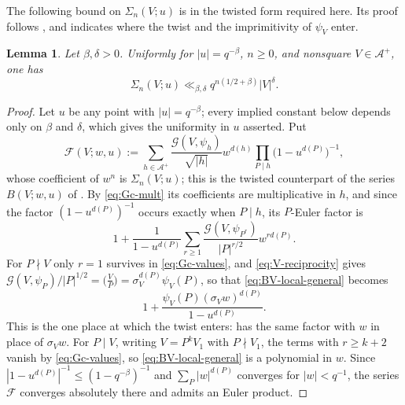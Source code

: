 \documentclass[a4paper,reqno]{amsart}
\numberwithin{equation}{section}
\newtheorem{lemma}[theorem]{Lemma}
\theoremstyle{remark}
\theoremstyle{definition}
\newcommand{\A}{\mathcal{A}}
\newcommand{\Gc}{\mathcal{G}}
\begin{document}
The following bound on $\Sigma_n(V;u)$ is \cite[(7.5)]{Fl17-1} in the
twisted form required here. Its proof follows \cite[Section~7]{Fl17-1}, and
indicates where the twist and the imprimitivity of $\psi_V$ enter.

\begin{lemma}
\label{lem:nonsquare-coeff}
Let $\beta,\delta>0$. Uniformly for $|u|=q^{-\beta}$, $n\ge0$,
and nonsquare $V\in\A^+$, one has
\begin{equation}\label{eq:nonsquare-coeff-bound}
\Sigma_n(V;u)
\ll_{\beta,\delta}
q^{n(1/2+\beta)}|V|^\delta.
\end{equation}
\end{lemma}

\begin{proof}
Let $u$ be any point with $|u|=q^{-\beta}$; every implied constant below
depends only on $\beta$ and $\delta$, which gives the uniformity in $u$
asserted. Put
$$
\mathcal F(V;w,u)
:=\sum_{h\in\A^+}\frac{\Gc(V,\psi_h)}{\sqrt{|h|}}w^{d(h)}
\prod_{P\mid h}\bigl(1-u^{d(P)}\bigr)^{-1},
$$
whose coefficient of $w^n$ is $\Sigma_n(V;u)$; this is the twisted
counterpart of the series $B(V;w,u)$ of \cite[(7.2)]{Fl17-1}. By \eqref{eq:Gc-mult} its coefficients
are multiplicative in $h$, and since the factor $(1-u^{d(P)})^{-1}$ occurs
exactly when $P\mid h$, its $P$-Euler factor is
\begin{equation}\label{eq:BV-local-general}
1+\frac{1}{1-u^{d(P)}}\sum_{r\ge1}
\frac{\Gc(V,\psi_{P^r})}{|P|^{r/2}}w^{rd(P)}.
\end{equation}
For $P\nmid V$ only $r=1$ survives in \eqref{eq:Gc-values}, and
\eqref{eq:V-reciprocity} gives
$\Gc(V,\psi_P)/|P|^{1/2}=\bigl(\frac VP\bigr)=\sigma_V^{d(P)}\psi_V(P)$, so
that \eqref{eq:BV-local-general} becomes
\begin{equation}\label{eq:BV-local-coprime}
1+\frac{\psi_V(P)(\sigma_Vw)^{d(P)}}{1-u^{d(P)}}.
\end{equation}
This is the one place at which the twist enters: \cite[(7.2)]{Fl17-1} has
the same factor with $w$ in place of $\sigma_Vw$. For $P\mid V$, writing
$V=P^kV_1$ with $P\nmid V_1$, the terms with $r\ge k+2$ vanish by
\eqref{eq:Gc-values}, so \eqref{eq:BV-local-general} is a polynomial in $w$.
Since $|1-u^{d(P)}|^{-1}\le(1-q^{-\beta})^{-1}$ and $\sum_P|w|^{d(P)}$
converges for $|w|<q^{-1}$, the series $\mathcal F$ converges absolutely
there and admits an Euler product.


\end{proof}
\end{document}
